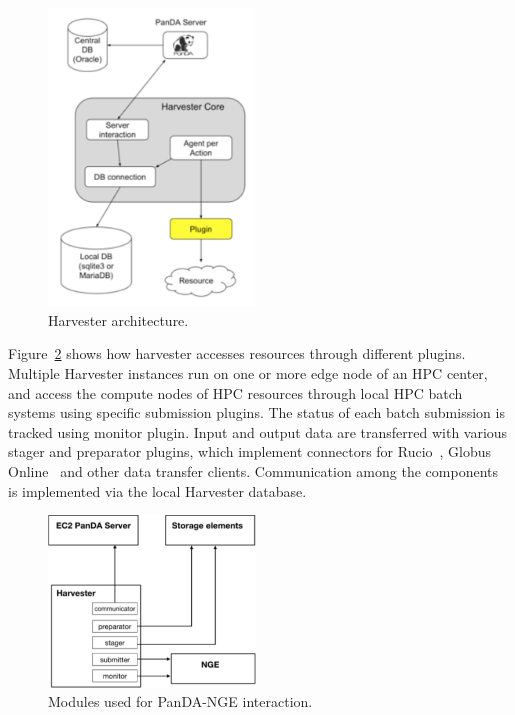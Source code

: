 \documentclass{webofc}
\begin{document}
\begin{figure}
  \centering
  \includegraphics[width=0.49\textwidth]{figures/panda-harvester-overview.pdf}
  \caption{Harvester architecture.}
  \label{fig:harvester-architecture}
\end{figure}

Figure~\ref{fig:harvester-modules} shows how harvester accesses resources
through different plugins. Multiple Harvester instances run on one or more
edge node of an HPC center, and access the compute nodes of HPC resources
through local HPC batch systems using specific submission plugins. The status
of each batch submission is tracked using monitor plugin. Input and output
data are transferred with various stager and preparator plugins, which
implement connectors for Rucio~\cite{garonne2014rucio}, Globus
Online~\cite{foster2011globus} and other data transfer clients. Communication
among the components is implemented via the local Harvester database.

\begin{figure}
	\centering
	\includegraphics[width=0.49\textwidth]{figures/panda-harvester-modules.pdf}
	\caption{Modules used for PanDA-NGE interaction.}
	\label{fig:harvester-modules}
\end{figure}
\end{document}
